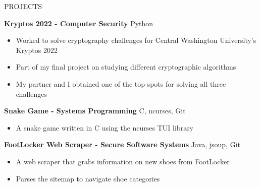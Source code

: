 \documentclass{resume}
\begin{document}
\begin{rSection}{PROJECTS}
	\vspace{-1.25em}

	\item \textbf{Kryptos 2022 - Computer Security} \hfill {Python}\\
	\vspace{-1.25em}
	\begin{itemize}
		\setlength{\itemsep}{-3pt}
		\item Worked to solve cryptography challenges for Central Washington University's Kryptos 2022
		\item Part of my final project on studying different cryptographic algorithms
		\item My partner and I obtained one of the top spots for solving all three challenges
	\end{itemize}

	\item \textbf{Snake Game - Systems Programming} \hfill {C, ncurses, Git}\\
	\vspace{-1.25em}
	\begin{itemize}
		\setlength{\itemsep}{-3pt}
		\item A snake game written in C using the ncurses TUI library
	\end{itemize}

	\item \textbf{FootLocker Web Scraper - Secure Software Systems} \hfill {Java, jsoup, Git}\\
	\vspace{-1.25em}
	\begin{itemize}
		\setlength{\itemsep}{-3pt}
		\item A web scraper that grabs information on new shoes from FootLocker
		\item Parses the sitemap to navigate shoe categories
	\end{itemize}

\end{rSection}

\end{document}
